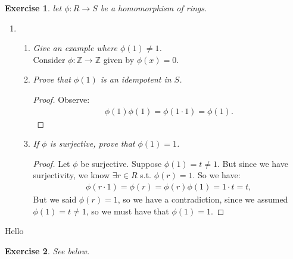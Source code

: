 \documentclass[10pt,oneside,reqno]{amsart}
\theoremstyle{plain}
\newtheorem{e}{Exercise}
\theoremstyle{definition}
\begin{document}
\begin{e}
let $\phi: R \to S$ be a homomorphism of rings. 
\end{e}

\begin{enumerate}
\item []
\begin{enumerate}


\item \textit{Give an example where $\phi(1) \neq 1$.}
\\Consider $\phi:\mathbb{Z} \to \mathbb{Z}$ given by $\phi(x) = 0$. \\

\item \textit{Prove that $\phi(1)$ is an idempotent in $S$. }\\
\begin{proof}
Observe: 
\begin{equation}
\begin{aligned}
\phi(1)\phi(1) = \phi(1\cdot 1) = \phi(1). 
\end{aligned}
\end{equation}
\end{proof}
\item \textit{If $\phi$ is surjective, prove that $\phi(1) = 1$. }
\begin{proof}
Let $\phi$ be surjective. Suppose $\phi(1)  = t \neq 1$. But since we have surjectivity, we know $\exists r \in R$ s.t. $\phi(r) = 1$. So we have: 
\begin{equation}
\begin{aligned}
\phi(r \cdot 1) = \phi(r) = \phi(r)\phi(1) = 1 \cdot t = t,
\end{aligned}
\end{equation}
But we said $\phi(r) = 1$, so we have a contradiction, since we assumed $\phi(1) = t \neq 1$, so we must have that $\phi(1) = 1$. 
\end{proof}
\end{enumerate}
\end{enumerate}
Hello
\begin{e} See below. 
\end{e}
\end{document}
